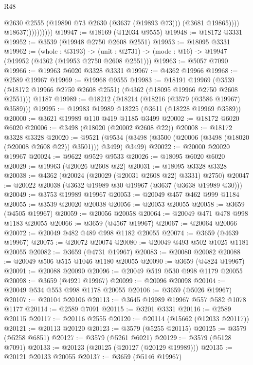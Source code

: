 \begin{lexlean}{R48}
\begin{coremodule}
                              @2630
                              @2555
                              (@19890 @73 @2630 (@3637 (@19893 @73)))
                              (@3681 @19865))))
                        @18637))))))))))
@19947 := @18169 (@12034 @9555)
@19948 := @18172 @3331
@19952 := @3539 (@19948 @2750 @2608 @2551)
@19953 := @18095 @3331
@19962 := (whole : @3193) ->
  (unit : @2731) -> (mode : @16) -> @19947 (@19952 (@4362 (@19953 @2750 @2608 @2551)))
@19963 := @5057 @7090
@19966 := @19963 @6020 @3328 @3331
@19967 := @4362 @19966
@19968 := @2589 @19967
@19969 := @19968 @9555
@19983 := @18191
    @19969
    (@3539 (@18172 @19966 @2750 @2608 @2551) (@4362 (@18095 @19966 @2750 @2608 @2551)))
    @1187
@19989 := @18212 (@18214 (@18216 (@3579 (@3586 @19967) @3589)))
@19995 := @19983 @19989 @18225 (@3611 (@18228 @19969 @3589))
@20000 := @3621 @19989 @110 @419 @1185 @3499
@20002 := @18172 @6020 @6020
@20006 := @3498 (@18020 (@20002 @2608 @22))
@20008 := @18172 @3328 @3328
@20020 := @9521
    (@9534 (@3498 (@3500 (@20006 (@3498 (@18020 (@20008 @2608 @22)) @3501))) @3499) @3499)
@20022 := @20000 @20020 @19967
@20024 := @9622 @9529 @9533
@20026 := @18095 @6020 @6020
@20029 := @19963 (@20026 @2608 @22)
@20031 := @18095 @3328 @3328
@20038 := @4362 (@20024 (@20029 (@20031 @2608 @22) @3331) @2750)
@20047 := @20022 @20038 (@3632 @19989 @30 @19967 (@3637 (@3638 @19989 @30)))
@20049 := @3753 @19989 @19967
@20053 := @20049 @457 @462 @999 @1184
@20055 := @3539 @20020 @20038
@20056 := @20053 @20055
@20058 := @3659 (@4505 @19967)
@20059 := @20056 @20058
@20064 := @20049 @471 @478 @998 @1183 @20055
@20066 := @3659 (@4567 @19967)
@20067 := @20064 @20066
@20072 := @20049 @482 @489 @998 @1182 @20055
@20074 := @3659 (@4639 @19967)
@20075 := @20072 @20074
@20080 := @20049 @493 @502 @1025 @1181 @20055
@20082 := @3659 (@4731 @19967)
@20083 := @20080 @20082
@20088 := @20049 @506 @515 @1046 @1180 @20055
@20090 := @3659 (@4824 @19967)
@20091 := @20088 @20090
@20096 := @20049 @519 @530 @998 @1179 @20055
@20098 := @3659 (@4921 @19967)
@20099 := @20096 @20098
@20104 := @20049 @534 @553 @998 @1178 @20055
@20106 := @3659 (@5026 @19967)
@20107 := @20104 @20106
@20113 := @3645 @19989 @19967 @557 @582 @1078 @1177
@20114 := @2589 @7091
@20115 := @3201 @3331
@20116 := @2589 @20115
@20117 := @20116 @2555
@20120 := @20114 (@15662 (@12033 @20117))
@20121 := @20113 @20120
@20123 := @3579 (@5255 @20115)
@20125 := @3579 (@5258 @6851)
@20127 := @3579 (@5261 @6021)
@20129 := @3579 (@5128 @7091)
@20133 := @20123 (@20125 (@20127 (@20129 @19989)))
@20135 := @20121 @20133 @20055
@20137 := @3659 (@5146 @19967)

\end{coremodule}
\end{lexlean}
